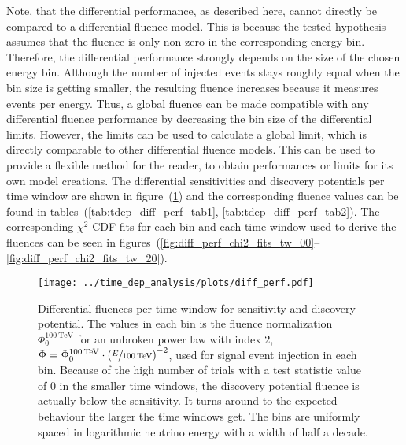 Note, that the differential performance, as described here, cannot directly be compared to a differential fluence model.
This is because the tested hypothesis assumes that the fluence is only non-zero in the corresponding energy bin.
Therefore, the differential performance strongly depends on the size of the chosen energy bin.
Although the number of injected events stays roughly equal when the bin size is getting smaller, the resulting fluence increases because it measures events per energy.
Thus, a global fluence can be made compatible with any differential fluence performance by decreasing the bin size of the differential limits.
However, the limits can be used to calculate a global limit, which is directly comparable to other differential fluence models.
This can be used to provide a flexible method for the reader, to obtain performances or limits for its own model creations.
The differential sensitivities and discovery potentials per time window are shown in figure~(\ref{fig:tdep_diff_perf}) and the corresponding fluence values can be found in tables~(\ref{tab:tdep_diff_perf_tab1}, \ref{tab:tdep_diff_perf_tab2}).
The corresponding $\chi^2$ CDF fits for each bin and each time window used to derive the fluences can be seen in figures~(\ref{fig:diff_perf_chi2_fits_tw_00}--\ref{fig:diff_perf_chi2_fits_tw_20}).

\begin{figure}[htbp]
  \centering
  \texttt{[image: ../time\_dep\_analysis/plots/diff\_perf.pdf]}
  \caption[Time-dependent differential performances]{
    Differential fluences per time window for sensitivity and discovery potential.
    The values in each bin is the fluence normalization $\Phi_0^{\SI{100}{\TeV}}$ for an unbroken power law with index $2$, $\Phi = \Phi_0^{\SI{100}{\TeV}}\cdot \left(\sfrac{E}{\SI{100}{\TeV}}\right)^{-2}$, used for signal event injection in each bin.
    Because of the high number of trials with a test statistic value of $0$ in the smaller time windows, the discovery potential fluence is actually below the sensitivity.
    It turns around to the expected behaviour the larger the time windows get.
    The bins are uniformly spaced in logarithmic neutrino energy with a width of half a decade.
  }
  \label{fig:tdep_diff_perf}
\end{figure}

